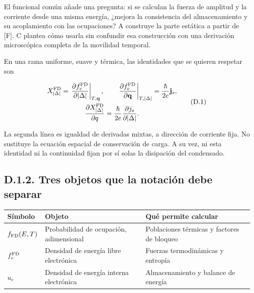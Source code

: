 \documentclass[
  spanish,
  10pt,
  a4paper,
]{article}
\newcounter{none} %
\begin{document}
El funcional común añade una pregunta: si se calculan la fuerza de
amplitud y la corriente desde una misma energía, ¿mejora la consistencia
del almacenamiento y su acoplamiento con las ocupaciones? A construye la
parte estática a partir de {[}F{]}. C plantea cómo usarla sin confundir
esa construcción con una derivación microscópica completa de la
movilidad temporal.

En una rama uniforme, suave y térmica, las identidades que se quieren
respetar son

\[
\begin{gathered}
X_{|\Delta|}^{\rm FD}
=\left.\frac{\partial f_e^{\rm FD}}{\partial|\Delta|}\right|_{T,\mathbf q},
\qquad
\left.\frac{\partial f_e^{\rm FD}}{\partial\mathbf q}\right|_{T,|\Delta|}
=\frac{\hbar}{2e}\mathbf j_s,\\
\frac{\partial X_{|\Delta|}^{\rm FD}}{\partial q}
=\frac{\hbar}{2e}\frac{\partial j_s}{\partial|\Delta|}.
\end{gathered}\tag{D.1}
\]

La segunda línea es igualdad de derivadas mixtas, a dirección de
corriente fija. No sustituye la ecuación espacial de conservación de
carga. A su vez, ni esta identidad ni la continuidad fijan por sí solas
la disipación del condensado.

\subsection{D.1.2. Tres objetos que la notación debe
separar}\label{d.1.2.-tres-objetos-que-la-notaciuxf3n-debe-separar}

{\def\LTcaptype{none} %
\begin{longtable}[]{@{}
  >{\raggedright\arraybackslash}p{}
  >{\raggedright\arraybackslash}p{}
  >{\raggedright\arraybackslash}p{}@{}}
\toprule\noalign{}
\begin{minipage}[b]{\linewidth}\raggedright
Símbolo
\end{minipage} & \begin{minipage}[b]{\linewidth}\raggedright
Objeto
\end{minipage} & \begin{minipage}[b]{\linewidth}\raggedright
Qué permite calcular
\end{minipage} \\
\midrule\noalign{}
\endhead
\bottomrule\noalign{}
\endlastfoot
\(f_{\rm FD}(E,T)\) & Probabilidad de ocupación, adimensional &
Poblaciones térmicas y factores de bloqueo \\
\(f_e^{\rm FD}\) & Densidad de energía libre electrónica & Fuerzas
termodinámicas y entropía \\
\(u_e\) & Densidad de energía interna electrónica & Almacenamiento y
balance de energía \\
\end{longtable}
}
\end{document}
